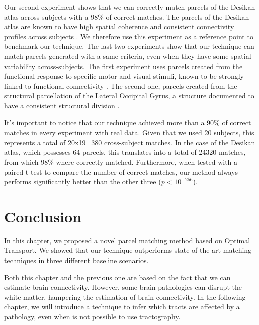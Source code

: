 Our second experiment shows that we can correctly match parcels of the Desikan atlas across subjects with a 98\% of correct matches. The parcels of the Desikan atlas are known to have high spatial coherence and consistent connectivity profiles across subjects \cite{DeReus2013}. We therefore use this experiment as a reference point to benchmark our technique.
The last two experiments show that our technique can match parcels generated with a same criteria, even when they have some spatial variability across-subjects. The first experiment uses parcels created from the functional response to specific motor and visual stimuli, known to be strongly linked to functional connectivity \cite{Osher2016, Penfield1954}. The second one, parcels created from the structural parcellation of the Lateral Occipital Gyrus, a structure documented to have a consistent structural division \cite{ThiebautdeSchotten2016, Gallardo2017a}. 

It's important to notice that our technique achieved more than a 90\% of correct matches in every experiment with real data. Given that we used 20 subjects, this represents a total of 20x19=380 cross-subject matches. In the case of the Desikan atlas, which possesses 64 parcels, this translates into a total of 24320 matches, from which 98\% where correctly matched. Furthermore, when tested with a paired t-test to compare the number of correct matches, our method always performs significantly better than the other three ($p<10^{-256}$).


\section{Conclusion}
In this chapter, we proposed a novel parcel matching method based on Optimal
Transport. We showed that our technique outperforms state-of-the-art matching
techniques in three different baseline scenarios.

Both this chapter and the previous one are based on the fact that we can
estimate brain connectivity. However, some brain pathologies can disrupt
the white matter, hampering the estimation of brain connectivity. In
the following chapter, we will introduce a technique to infer which
tracts are affected by a pathology, even when is not possible to use
tractography.



\chapterbib
